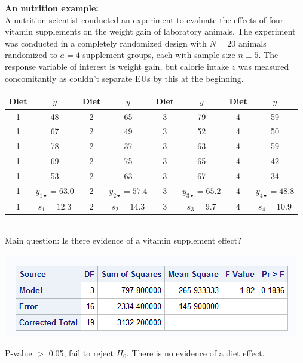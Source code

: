 \textbf{An nutrition example:}\\
A nutrition scientist conducted an experiment to evaluate the effects of four vitamin supplements on the weight gain of laboratory animals.  The experiment was conducted in a completely randomized design with $N=20$ animals randomized to $a=4$ supplement groups, each with sample size $n\equiv 5$.  The response variable of interest is weight gain, but calorie intake $z$ was measured concomitantly as couldn't separate EUs by this at the beginning.  
~\\
\begin{center}
\begin{tabular}{|cc|cc|cc|cc|} \hline
Diet & $y$ & Diet & $y$ &Diet & $y$ &Diet & $y$ \\ \hline
1 & 48 & 2 & 65 & 3 & 79 & 4 & 59 \\
1 & 67 & 2 & 49 & 3 & 52 & 4 & 50 \\
1 & 78 & 2 & 37 & 3 & 63 & 4 & 59 \\
1 & 69 & 2 & 75 & 3 & 65 & 4 & 42 \\
1 & 53 & 2 & 63 & 3 & 67 & 4 & 34 \\ \hline
1 & $\bar{y}_{1\bullet}=63.0$ & 2 & $\bar{y}_{2\bullet}=57.4$  & 3 & $\bar{y}_{3\bullet}=65.2$  & 4 & $\bar{y}_{4\bullet}=48.8$ \\
1 & $s_1=12.3$ & 2 & $s_2=14.3$  & 3 & $s_3=9.7$  & 4 & $s_4=10.9$ \\ \hline
\end{tabular} 
\end{center}
~\\

Main question: Is there evidence of a vitamin supplement effect?

\newpage

\begin{center}
\includegraphics{DietsANOVA}
\end{center}
 
P-value $>$ 0.05, fail to reject $H_0$.  There is no evidence of a diet effect.\\~\\~\\

